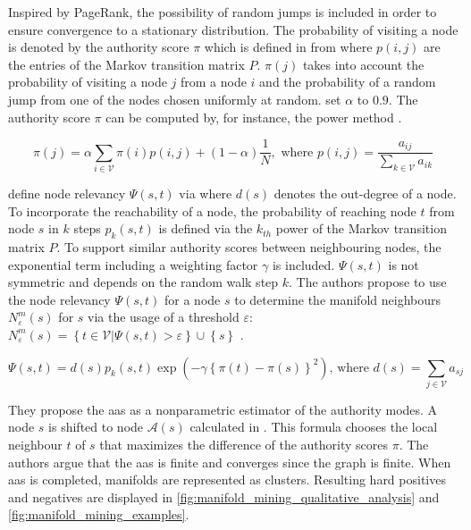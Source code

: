 Inspired by PageRank, the possibility of random jumps is included in order to ensure convergence to a stationary distribution. 
The probability of visiting a node is denoted by the authority score $\pi$ 
which is defined in  from \citet{mode_seeking_2012} 
where $p(i,j)$ are the entries of the Markov transition matrix $P$.
$\pi(j)$ takes into account the probability of visiting a node $j$ from a node $i$ and 
the probability of a random jump from one of the nodes chosen uniformly at random.
\citet{mode_seeking_2012} set $\alpha$ to $0.9$. 
The authority score $\pi$ can be computed by, for instance, the power method \citep{mode_seeking_2012,PageRank_2004}.

\begin{equation}
    \pi(j) = \alpha \sum_{i \in \mathcal{V}}^{}  \pi(i)p(i,j) + (1-\alpha)\frac{1}{N} , \text{ where } p(i,j) = \frac{a_{ij} }{\sum_{k \in \mathcal{V}}^{}a_{ik} } 
    \label{eq:authority_score}
\end{equation}

\citet{mode_seeking_2012} define node relevancy $\Psi(s,t)$ via  where $d(s)$ denotes the out-degree of a node.
To incorporate the reachability of a node, the probability of reaching node $t$ from node $s$ in $k$ steps $p_k(s,t)$ is 
defined via the $k_{th}$ power of the Markov transition matrix $P$.
To support similar authority scores between neighbouring nodes, the exponential term including a weighting factor $\gamma$ is included.
$\Psi(s,t)$ is not symmetric and depends on the random walk step $k$.
The authors propose to use the node relevancy $\Psi(s,t)$ for a node $s$ to determine the manifold neighbours $N_\varepsilon^m(s)$ for $s$ 
via the usage of a threshold $\varepsilon$: 
$N_\varepsilon^m(s) =  \left\{ t \in \mathcal{V} | \Psi(s,t) > \varepsilon \right\} \cup \left\{ s \right\}$ \citep{mode_seeking_2012}.

\begin{equation}
    \Psi(s,t) = d(s) p_k(s,t) \exp(-\gamma \left\{  \pi(t) - \pi(s)  \right\}^2)\text{, where } d(s) = \sum_{j\in \mathcal{V}}^{}a_{sj}
    \label{eq:node_relevancy}
\end{equation}

They propose the \ac{aas} as a nonparametric estimator of the authority modes.
A node $s$ is shifted to node $\mathcal{A}(s)$ calculated in . 
This formula chooses the local neighbour $t$ of $s$ that maximizes the difference of the authority scores $\pi$.
The authors argue that the \ac{aas} is finite and converges since the graph is finite.
When \ac{aas} is completed, manifolds are represented as clusters.
Resulting hard positives and negatives are displayed in \autoref{fig:manifold_mining_qualitative_analysis} and \autoref{fig:manifold_mining_examples}.

